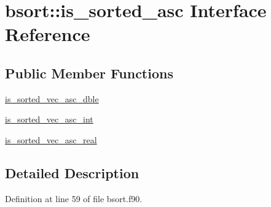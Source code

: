 \hypertarget{interfacebsort_1_1is__sorted__asc}{\section{bsort\-:\-:is\-\_\-sorted\-\_\-asc Interface Reference}
\label{interfacebsort_1_1is__sorted__asc}
}
\subsection*{Public Member Functions}
\begin{DoxyCompactItemize}
\item 
\hyperlink{interfacebsort_1_1is__sorted__asc_ae37cf25ad34b7c8a0c2180bb24d522ae_ae37cf25ad34b7c8a0c2180bb24d522ae}{is\-\_\-sorted\-\_\-vec\-\_\-asc\-\_\-dble}
\item 
\hyperlink{interfacebsort_1_1is__sorted__asc_a804b8e15365fc3bb4f532acc2762fb41_a804b8e15365fc3bb4f532acc2762fb41}{is\-\_\-sorted\-\_\-vec\-\_\-asc\-\_\-int}
\item 
\hyperlink{interfacebsort_1_1is__sorted__asc_a7c2205f40843ac6aa2cacb9c943b9e44_a7c2205f40843ac6aa2cacb9c943b9e44}{is\-\_\-sorted\-\_\-vec\-\_\-asc\-\_\-real}
\end{DoxyCompactItemize}


\subsection{Detailed Description}


Definition at line 59 of file bsort.\-f90.



